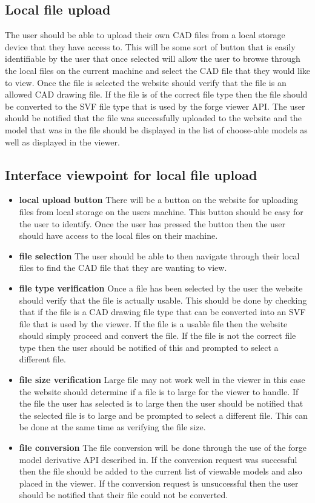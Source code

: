 \documentclass[letterpaper, 10pt, draftclsnofoot, compsoc, onecolumn]{IEEEtran}
\begin{document}
\subsection{Local file upload}
\label{local}
	The user should be able to upload their own CAD files from a local storage device that they have access to. This will be some sort of button that is easily identifiable by the user that once selected will allow the user to browse through the local files on the current machine and select the CAD file that they would like to view. Once the file is selected the website should verify that the file is an allowed CAD drawing file. If the file is of the correct file type then the file should be converted to the SVF file type that is used by the forge viewer API. The user should be notified that the file was successfully uploaded to the website and the model that was in the file should be displayed in the list of choose-able models as well as displayed in the viewer. 

\subsection{Interface viewpoint for local file upload}
\begin{itemize}
	\item[]\textbf{local upload button} There will be a button on the website for uploading files from local storage on the users machine. This button should be easy for the user to identify. Once the user has pressed the button then the user should have access to the local files on their machine.
	\item[]\textbf{file selection} The user should be able to then navigate through their local files to find the CAD file that they are wanting to view.
	\item[]\textbf{file type verification} Once a file has been selected by the user the website should verify that the file is actually usable. This should be done by checking that if the file is a CAD drawing file type that can be converted into an SVF file that is used by the viewer. If the file is a usable file then the website 			should simply proceed and convert the file. If the file is not the correct file type then the user should be notified of this and prompted to select a different file.  
	\item[]\textbf{file size verification} Large file may not work well in the viewer in this case the website should determine if a file is to large for the viewer to handle. If the file the user has selected is to large then the user should be notified that the selected file is to large and be prompted to select a different file.
	This can be done at the same time as verifying the file size.
	\item[]\textbf{file conversion} The file conversion will be done through the use of the forge model derivative API described in. If the conversion request was successful then the file should be added to the current list of viewable models and also placed in the viewer. If the conversion request is unsuccessful then the user should be notified that their file could not be converted. 
\end{itemize}
\end{document}

